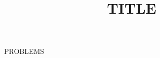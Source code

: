 \documentclass[12pt,letterpaper]{coursedoc}
\title{TITLE}
\begin{document}
\maketitle

\begin{description}
PROBLEMS
\end{description}
\end{document}
